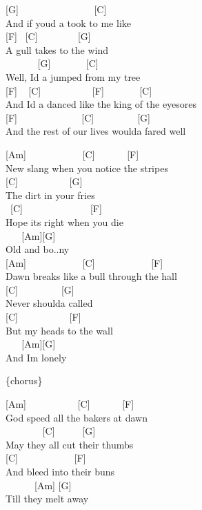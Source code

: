 \documentclass[
  letterpaper,
  twoside=false]{scrbook}
\begin{document}
{[}G{]} ~ ~ ~ ~ ~ ~ ~ ~ ~ {[}C{]}\\
And if you\textquotesingle d a took to me like\\
{[}F{]} ~{[}C{]} ~ ~ ~ ~ ~{[}G{]}\\
A gull takes to the wind\\
\hspace*{0.333em} ~ ~ ~ ~ {[}G{]} ~ ~ ~ ~ {[}C{]}\\
Well, I\textquotesingle d a jumped from my tree\\
\hspace*{0.333em} {[}F{]} ~ {[}C{]} ~ ~ ~ ~ ~ ~ {[}F{]} ~ ~ ~ ~
{[}C{]}\\
And I\textquotesingle d a danced like the king of the eyesores\\
{[}F{]} ~ ~ ~ ~ ~ ~ ~ ~{[}C{]} ~ ~ ~ ~ ~ {[}G{]}\\
And the rest of our lives would\textquotesingle a fared well

{[}Am{]} ~ ~ ~ ~ ~ ~ ~{[}C{]} ~ ~ ~ ~{[}F{]}\\
New slang when you notice the stripes\\
{[}C{]} ~ ~ ~ ~ ~ ~ {[}G{]}\\
The dirt in your fries\\
\hspace*{0.333em} ~{[}C{]} ~ ~ ~ ~ ~ ~ ~ ~ {[}F{]}\\
Hope it\textquotesingle s right when you die\\
\hspace*{0.333em} ~ ~ {[}Am{]}{[}G{]}\\
Old and bo..ny\\
{[}Am{]} ~ ~ ~ ~ ~ ~ ~{[}C{]} ~ ~ ~ ~ ~ ~ ~{[}F{]}\\
Dawn breaks like a bull through the hall\\
{[}C{]} ~ ~ ~ ~ ~ {[}G{]}\\
Never should\textquotesingle a called\\
\hspace*{0.333em} {[}C{]} ~ ~ ~ ~ ~ ~ {[}F{]}\\
But my heads to the wall\\
\hspace*{0.333em} ~ ~ {[}Am{]}{[}G{]}\\
And I\textquotesingle m lonely

\{chorus\}

{[}Am{]} ~ ~ ~ ~ ~ ~ {[}C{]} ~ ~ ~ ~{[}F{]}\\
God speed all the baker\textquotesingle s at dawn\\
\hspace*{0.333em} ~ ~ ~ ~ ~{[}C{]} ~ ~ ~ {[}G{]}\\
May they all cut their thumbs\\
\hspace*{0.333em} {[}C{]} ~ ~ ~ ~ ~ ~ ~{[}F{]}\\
And bleed into their buns\\
\hspace*{0.333em} ~ ~ ~ ~{[}Am{]} {[}G{]}\\
\textquotesingle Till they melt away
\end{document}
